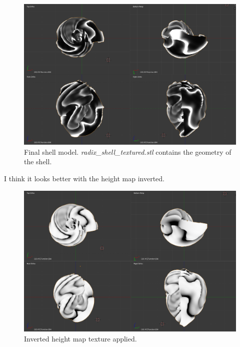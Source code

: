 \documentclass[a4paper]{article}
\begin{document}
\begin{figure}[h]
	\centering\includegraphics[scale=1.0]{./img/hexaplex_quad.png}
	\caption{Final shell model. \textit{radix\_shell\_textured.stl} contains the geometry of the shell.}
	\label{3d-printed-torus} %
\end{figure}

I think it looks better with the height map inverted.

\begin{figure}[h]
	\centering\includegraphics[scale=1.0]{./img/hexaplex_quad_inverted.png}
	\caption{Inverted height map texture applied.}
	\label{3d-printed-torus} %
\end{figure}
\end{document}

